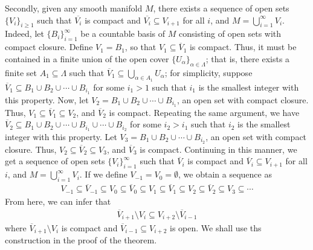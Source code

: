 Secondly, given any smooth manifold $M$, there exists a sequence of open sets $\{V_{i}\}_{i \geq 1}$ such that $\overline{V_{i}}$ is compact and $\overline{V_{i}} \subseteq V_{i+1}$ for all $i$, and $M = \bigcup_{i=1}^{\infty} V_{i}$. Indeed, let $\{B_{i}\}_{i=1}^{\infty}$ be a countable basis of $M$ consisting of open sets with compact closure. Define $V_{1} = B_{1}$, so that $V_{1} \subseteq \overline{V}_{1}$ is compact. Thus, it must be contained in a finite union of the open cover $\{U_{\alpha}\}_{\alpha \in \Lambda}$; that is, there exists a finite set $A_{1} \subseteq \Lambda$ such that $\overline{V}_{1} \subseteq \bigcup_{\alpha \in A_{1}} U_{\alpha}$; for simplicity, suppose $\overline{V}_{1} \subseteq B_{1} \cup B_{2} \cup \cdots \cup B_{i_{1}}$ for some $i_{1} > 1$ such that $i_{1}$ is the smallest integer with this property. Now, let $V_{2} = B_{1} \cup B_{2} \cup \cdots \cup B_{i_{1}}$, an open set with compact closure. Thus, $V_{1} \subseteq \overline{V}_{1} \subseteq V_{2}$, and $\overline{V}_{2}$ is compact. Repeating the same argument, we have $\overline{V}_{2} \subseteq B_{1} \cup B_{2} \cup \cdots \cup B_{i_{1}} \cup \cdots \cup B_{i_{2}}$ for some $i_{2} > i_{1}$ such that $i_{2}$ is the smallest integer with this property. Let $V_{3} = B_{1} \cup B_{2} \cup \cdots \cup B_{i_{2}}$, an open set with compact closure. Thus, $V_{2} \subseteq \overline{V}_{2} \subseteq V_{3}$, and $\overline{V}_{3}$ is compact. Continuing in this manner, we get a sequence of open sets $\{V_{i}\}_{i=1}^{\infty}$ such that $\overline{V}_{i}$ is compact and $\overline{V}_{i} \subseteq V_{i+1}$ for all $i$, and $M = \bigcup_{i=1}^{\infty} V_{i}$. If we define $V_{-1} = V_{0} = \emptyset$, we obtain a sequence as
\begin{align}
    V_{-1} \subseteq \overline{V}_{-1} \subseteq V_{0} \subseteq \overline{V}_{0} \subseteq V_{1} \subseteq \overline{V}_{1} \subseteq V_{2} \subseteq \overline{V}_{2} \subseteq V_{3} \subseteq \cdots
\end{align}
From here, we can infer that
\begin{align}
    \overline{V}_{i+1} \setminus V_{i} \subseteq V_{i+2} \setminus \overline{V}_{i-1}
\end{align}
where $\overline{V}_{i+1} \setminus V_{i}$ is compact and $\overline{V}_{i-1} \subseteq V_{i+2}$ is open. We shall use ths construction in the proof of the theorem.

